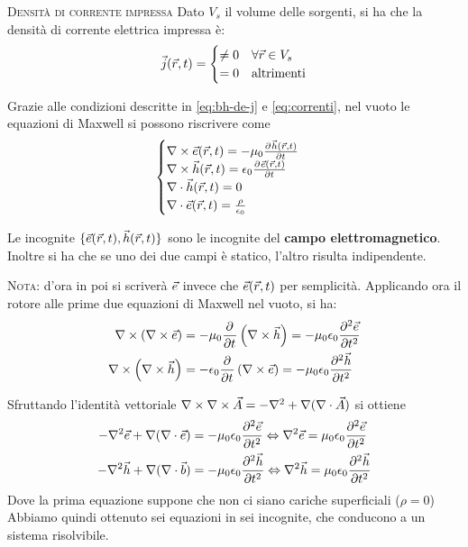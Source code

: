 \textsc{Densità di corrente impressa}
Dato $V_s$ il volume delle sorgenti, si ha che la densità di corrente elettrica impressa è:
\begin{equation} \vec{j}(\r,t)=
  \begin{cases}
    \neq 0 & \forall \r \in V_s \\
    =0 & \text{altrimenti}
  \end{cases}
  \label{eq:correnti}
\end{equation}

Grazie alle condizioni descritte in \eqref{eq:bh-de-j} e \eqref{eq:correnti}, nel vuoto
le equazioni di Maxwell si possono riscrivere come
\begin{equation}\begin{cases}
  \rot \ert = -\mu_0 \deriv{\hrt}{t} \\
  \rot \hrt = \epsilon_0 \deriv{\ert}{t}\\
  \diverg \hrt = 0 \\ \diverg\ert = \frac{\rho}{\epsilon_0}
\end{cases}\label{eq:maxwell-vuoto}\end{equation}

Le incognite $\{\ert, \hrt\}$ sono le incognite del \textbf{campo elettromagnetico}.
Inoltre si ha che se uno dei due campi è statico, l'altro risulta indipendente.

\textsc{Nota:} d'ora in poi si scriverà $\e$ invece che $\ert$ per semplicità.
Applicando ora il rotore alle prime due equazioni di Maxwell nel vuoto, si ha:
\begin{equation}\begin{split}
  \rot\left(\rot\e\right) &= -\mu_0 \deriv{}{t} \left(\rot\h\right) = -\mu_0\epsilon_0 \deriv[2]{\e}{t} \\
  \rot\left(\rot\h\right) &= -\epsilon_0 \deriv{}{t} \left(\rot\e\right) = -\mu_0\epsilon_0 \deriv[2]{\h}{t} \\
\end{split}\end{equation}

Sfruttando l'identità vettoriale $\rot\rot\vec{A} = -\nabla^2 + \nabla(\diverg\vec{A})$ si ottiene
\begin{equation}\begin{split}
  -\nabla^2\e + \nabla(\diverg\e) &= - \mu_0\epsilon_0 \deriv[2]{\e}{t} \Leftrightarrow \nabla^2\e = \mu_0\epsilon_0\deriv[2]{\e}{t}\\
  -\nabla^2\h + \nabla(\diverg\b) &= - \mu_0\epsilon_0 \deriv[2]{\h}{t} \Leftrightarrow \nabla^2\h = \mu_0\epsilon_0\deriv[2]{\h}{t}\\
\end{split}\end{equation}
Dove la prima equazione suppone che non ci siano cariche superficiali ($\rho=0$)
Abbiamo quindi ottenuto sei equazioni in sei incognite, che conducono a un sistema risolvibile.

